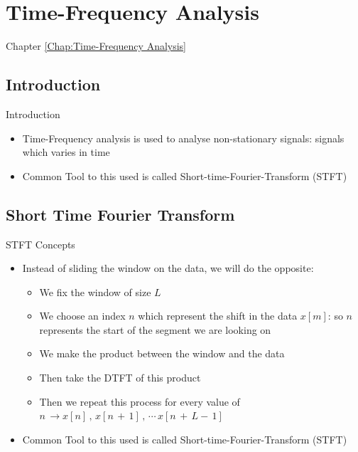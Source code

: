 \section{Time-Frequency Analysis}
\label{Chap:Time-Frequency Analysis}
\begin{frame}[t]{Chapter \autoref{Chap:Time-Frequency Analysis}}
\tableofcontents[sections= \value{section}]
\end{frame}


\subsection{Introduction}
\begin{frame}[t]{Introduction}

\begin{itemize}

\item Time-Frequency analysis is used to analyse non-stationary signals: signals which varies in time

\item Common Tool to this used is called Short-time-Fourier-Transform (STFT)

\end{itemize}

\end{frame}


\subsection{Short Time Fourier Transform}
\begin{frame}[t]{STFT Concepts}

\begin{itemize}

\item Instead of sliding the window on the data, we will do the opposite:

	\begin{itemize}
	\item We fix the window of size $L$
	
	\item We choose an index $n$ which represent the shift in the data $x[m]$: so $n$ represents the start of the segment we are looking on 
	
	\item We make the product between the window and the data
	
	\item Then take the DTFT of this product
	
	
	\item Then we repeat this process for every value of $n \, \rightarrow x[n] \, , \, x[n \, + \, 1] \, , \, \cdots \, x[n \, + \, L - \, 1]$
	\end{itemize}

\item Common Tool to this used is called Short-time-Fourier-Transform (STFT)

\end{itemize}


\end{frame}


